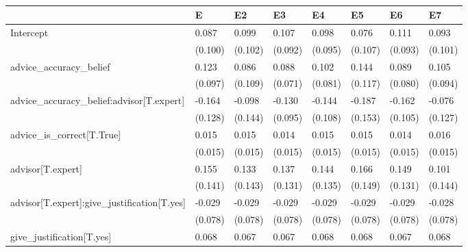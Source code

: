 \begin{table}
\caption{}
\label{}
\begin{center}
\begin{tabular}{llllllll}
\hline
                                                    & E        & E2       & E3       & E4       & E5       & E6       & E7        \\
\hline
Intercept                                           & 0.087    & 0.099    & 0.107    & 0.098    & 0.076    & 0.111    & 0.093     \\
                                                    & (0.100)  & (0.102)  & (0.092)  & (0.095)  & (0.107)  & (0.093)  & (0.101)   \\
advice\_accuracy\_belief                            & 0.123    & 0.086    & 0.088    & 0.102    & 0.144    & 0.089    & 0.105     \\
                                                    & (0.097)  & (0.109)  & (0.071)  & (0.081)  & (0.117)  & (0.080)  & (0.094)   \\
advice\_accuracy\_belief:advisor[T.expert]          & -0.164   & -0.098   & -0.130   & -0.144   & -0.187   & -0.162   & -0.076    \\
                                                    & (0.128)  & (0.144)  & (0.095)  & (0.108)  & (0.153)  & (0.105)  & (0.127)   \\
advice\_is\_correct[T.True]                         & 0.015    & 0.015    & 0.014    & 0.015    & 0.015    & 0.014    & 0.016     \\
                                                    & (0.015)  & (0.015)  & (0.015)  & (0.015)  & (0.015)  & (0.015)  & (0.015)   \\
advisor[T.expert]                                   & 0.155    & 0.133    & 0.137    & 0.144    & 0.166    & 0.149    & 0.101     \\
                                                    & (0.141)  & (0.143)  & (0.131)  & (0.135)  & (0.149)  & (0.131)  & (0.144)   \\
advisor[T.expert]:give\_justification[T.yes]        & -0.029   & -0.029   & -0.029   & -0.029   & -0.029   & -0.029   & -0.028    \\
                                                    & (0.078)  & (0.078)  & (0.078)  & (0.078)  & (0.078)  & (0.078)  & (0.078)   \\
give\_justification[T.yes]                          & 0.068    & 0.067    & 0.067    & 0.068    & 0.068    & 0.067    & 0.068     \\

\end{tabular}
\end{center}
\end{table}
